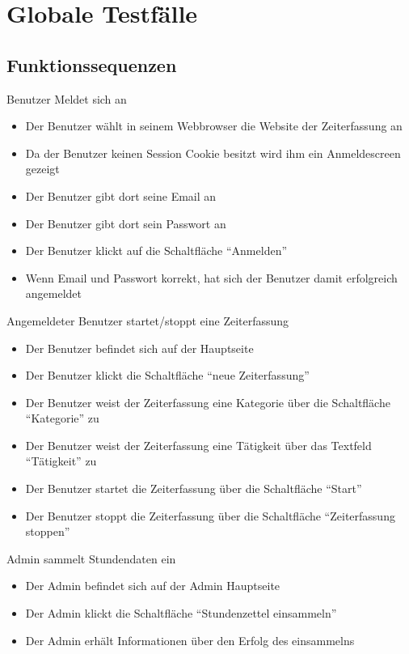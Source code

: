 \section{Globale Testfälle}

\subsection{Funktionssequenzen}
\begin{requirements}
	 Benutzer Meldet sich an
	\begin{itemize}
  			\item Der Benutzer wählt in seinem Webbrowser die Website der Zeiterfassung an
  			\item Da der Benutzer keinen Session Cookie besitzt wird ihm ein Anmeldescreen gezeigt
  			\item Der Benutzer gibt dort seine Email an
  			\item Der Benutzer gibt dort sein Passwort an
  			\item Der Benutzer klickt auf die Schaltfläche "`Anmelden"'
  			\item Wenn Email und Passwort korrekt, hat sich der Benutzer damit erfolgreich angemeldet
	\end{itemize}
	 Angemeldeter Benutzer startet/stoppt eine Zeiterfassung
	\begin{itemize}
		\item Der Benutzer befindet sich auf der Hauptseite
		\item Der Benutzer klickt die Schaltfläche "`neue Zeiterfassung"'
		\item Der Benutzer weist der Zeiterfassung eine Kategorie über die Schaltfläche "`Kategorie"' zu
		\item Der Benutzer weist der Zeiterfassung eine Tätigkeit über das Textfeld "`Tätigkeit"' zu
		\item Der Benutzer startet die Zeiterfassung über die Schaltfläche "`Start"'
		\item Der Benutzer stoppt die Zeiterfassung über die Schaltfläche "`Zeiterfassung stoppen"'
	\end {itemize}
	 Admin sammelt Stundendaten ein
	\begin{itemize}
		\item Der Admin befindet sich auf der Admin Hauptseite
		\item Der Admin klickt die Schaltfläche "`Stundenzettel einsammeln"'
		\item Der Admin erhält Informationen über den Erfolg des einsammelns

\end{itemize}
\end{requirements}
